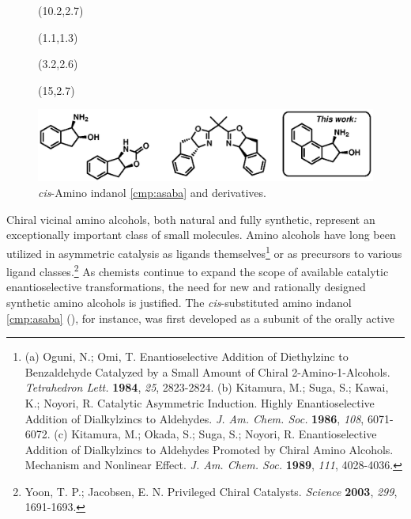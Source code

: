 \begin{figure}[b]
  \centering
   \begin{textblock}{1}(10.2,2.7)  \end{textblock}
   \begin{textblock}{1}(1.1,1.3)  \end{textblock}
   \begin{textblock}{1}(3.2,2.6)  \end{textblock}
   \begin{textblock}{1}(15,2.7)  \end{textblock}
  \includegraphics[scale=0.8]{chp_asymmetric/images/indanylchart}
  \caption{\textit{cis}-Amino indanol \ref{cmp:asaba} and derivatives.}
  \label{fig:asindanylchart}
\end{figure}
Chiral vicinal amino alcohols, both natural and fully synthetic, represent an exceptionally
important class of small molecules. Amino alcohols have long been utilized in asymmetric catalysis
as ligands themselves\footnote{(a) {\frenchspacing Oguni, N.; Omi, T. Enantioselective Addition of Diethylzinc to
Benzaldehyde Catalyzed by a Small Amount of Chiral 2-Amino-1-Alcohols. \textit{Tetrahedron Lett.}
\textbf{1984}, \textit{25}, 2823-2824.} (b) {\frenchspacing Kitamura, M.; Suga, S.; Kawai, K.;
Noyori, R. Catalytic Asymmetric Induction. Highly Enantioselective Addition of Dialkylzincs to
Aldehydes. \textit{J. Am. Chem. Soc.} \textbf{1986}, \textit{108}, 6071-6072.} (c) {\frenchspacing
Kitamura, M.; Okada, S.; Suga, S.; Noyori, R. Enantioselective Addition of Dialkylzincs to Aldehydes
Promoted by Chiral Amino Alcohols. Mechanism and Nonlinear Effect. \textit{J. Am. Chem. Soc.}
\textbf{1989}, \textit{111}, 4028-4036.}} or as precursors to various ligand
classes.\footnote{{\frenchspacing Yoon, T. P.; Jacobsen, E. N. Privileged Chiral Catalysts.
\textit{Science} \textbf{2003}, \textit{299}, 1691-1693.}} As chemists continue to expand the scope
of available catalytic enantioselective transformations, the need for new and rationally designed
synthetic amino alcohols is justified. The \textit{cis}-substituted amino indanol \ref{cmp:asaba}
(), for instance, was first developed as a subunit of the orally active

